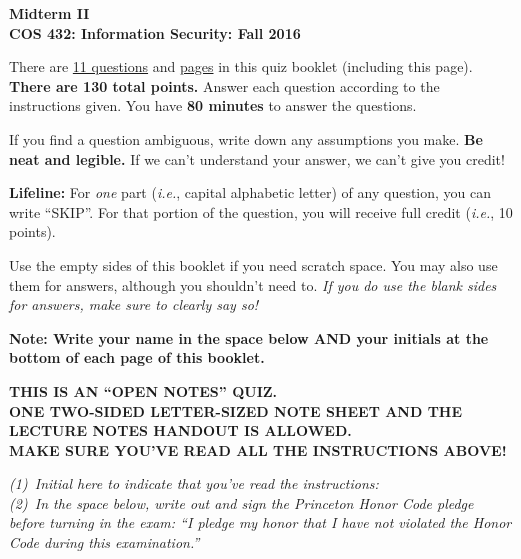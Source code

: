 \documentclass[11pt]{article}
\newcommand{\ie}{{\em i.e.}}
\newcounter{answer}
\begin{document}
\begin{center}
{\LARGE{\bf Midterm II}} \\
\vspace{.15in}
{\Large{\bf COS 432: Information Security: Fall 2016}} \\
\vspace{.2in}

\begin{boxedminipage}[h]{6in}
  There are \underline{11 questions} and \underline{\pageref{lastpage}
    pages} in this quiz booklet (including this page). {\bf There are
    130 total points.}  Answer each question according to the
  instructions given.  You have {\bf 80 minutes} to answer the
  questions.

\vspace{.1in} 
If you find a question ambiguous, write down any
assumptions you make.  {\bf Be neat and legible.}  If we can't
understand your answer, we can't give you credit!  

\vspace*{.1in} {\bf Lifeline:} For {\em one} part (\ie, capital alphabetic
letter) of any question, you can write ``SKIP''. For that portion of the
question, you will receive full credit (\ie, 10 points).

\vspace{.1in} 
Use the empty sides of this booklet if you need scratch space.  You
may also use them for answers, although you shouldn't need to.  {\em If you
do use the blank sides for answers, make sure to clearly say so!}

\vspace{.1in} 
{\bf Note: Write your name in the space below AND your initials at the bottom of each
page of this booklet.}

\begin{center}{\bf THIS IS AN ``OPEN NOTES'' QUIZ.\\
ONE TWO-SIDED LETTER-SIZED NOTE SHEET AND THE LECTURE NOTES HANDOUT IS
ALLOWED. \\ 
MAKE SURE YOU'VE READ ALL THE INSTRUCTIONS ABOVE!}
\end{center}
{\em (1)~Initial here to indicate that you've read the instructions: \\ 
(2)~In the space below, write out and sign the Princeton Honor Code pledge before 
turning in the exam: ``I pledge my honor that I have not violated the Honor Code during this examination.'' }
\vspace{0.5in}
\\



\end{boxedminipage}
\end{center}
\end{document}
